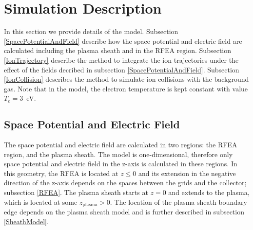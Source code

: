 \section{\label{Simulation}Simulation Description}
In this section we provide details of the model. Subsection \ref{SpacePotentialAndField} describe how the space potential and electric field are calculated including the plasma sheath and in the RFEA region. Subsection \ref{IonTrajectory} describe the method to integrate the ion trajectories under the effect of the fields decribed in subsection \ref{SpacePotentialAndField}. Subsection \ref{IonCollision} describes the method to simulate ion collisions with the background gas. Note that in the model, the electron temperature is kept constant with value $T_e=3$~eV.

\subsection{\label{SpacePotentialAndField}Space Potential and Electric Field}
The space potential and electric field are calculated in two regions: the RFEA region, and the plasma sheath. The model is one-dimensional, therefore only space potential and electric field in the z-axis is calculated in these regions. In this geometry, the RFEA is located at $z \leq 0$ and its extension in the negative direction of the z-axis depends on the spaces between the grids and the collector; subsection \ref{RFEA}. The plasma sheath starts at $z=0$ and extends to the plasma, which is located at some $z_\text{plasma} > 0$. The location of the plasma sheath boundary edge depends on the plasma sheath model and is further described in subsection \ref{SheathModel}.   

